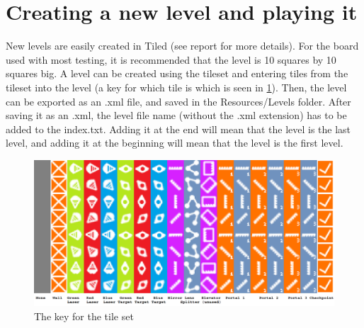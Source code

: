 \documentclass[]{report}
\begin{document}
\section*{Creating a new level and playing it}
New levels are easily created in Tiled (see report for more details). For the board used with most testing,
it is recommended that the level is 10 squares by 10 squares big. A level can be
created using the tileset and entering tiles from the tileset into the level
(a key for which tile is which is seen in \ref{fig:tilekey}). Then, the 
level can be exported as an .xml file, and saved in the Resources/Levels folder.
After saving it as an .xml, the level file name (without the .xml extension)
has to be added to the index.txt. Adding it at the end will mean that the level
is the last level, and adding it at the beginning will mean that the level is
the first level.
\begin{figure}[!ht]
    \centering
    \includegraphics[scale = 0.3]{TileKey}
    \caption{The key for the tile set}
    \label{fig:tilekey}
\end{figure}
\end{document}

